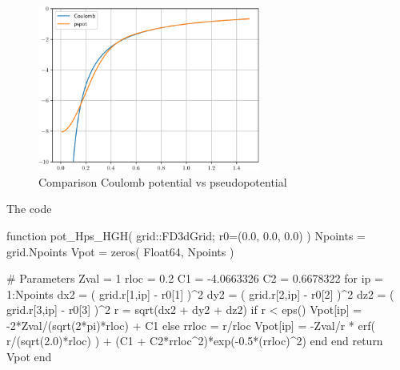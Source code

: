 \begin{figure}[H]
{\centering
\includegraphics[width=0.65\textwidth]{../codes/sch_3d/IMG_H_Coulomb_vs_pspot.pdf}
\par}
\caption{Comparison Coulomb potential vs pseudopotential}
\end{figure}

The code
\begin{juliacode}
function pot_Hps_HGH( grid::FD3dGrid; r0=(0.0, 0.0, 0.0) )
    Npoints = grid.Npoints
    Vpot = zeros( Float64, Npoints )

    # Parameters
    Zval = 1
    rloc = 0.2
    C1 = -4.0663326
    C2 = 0.6678322
    for ip = 1:Npoints
        dx2 = ( grid.r[1,ip] - r0[1] )^2
        dy2 = ( grid.r[2,ip] - r0[2] )^2
        dz2 = ( grid.r[3,ip] - r0[3] )^2
        r = sqrt(dx2 + dy2 + dz2)
        if r < eps()
            Vpot[ip] = -2*Zval/(sqrt(2*pi)*rloc) + C1
        else
            rrloc = r/rloc
            Vpot[ip] = -Zval/r * erf( r/(sqrt(2.0)*rloc) ) +
                     (C1 + C2*rrloc^2)*exp(-0.5*(rrloc)^2)
        end
    end
    return Vpot
end
\end{juliacode}
